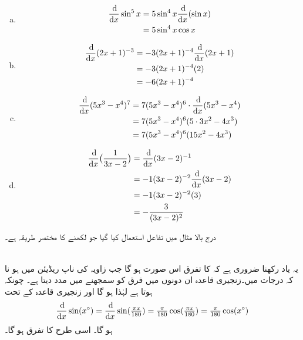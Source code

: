 \begin{enumerate}[a.]
\item
\begin{align*}
\frac{\dif}{\dif x}\sin^5x&=5\sin^4x\frac{\dif}{\dif x}(\sin x)\\
&=5\sin^4x\cos x
\end{align*}
\item
\begin{align*}
\frac{\dif}{\dif x}(2x+1)^{-3}&=-3(2x+1)^{-4}\frac{\dif}{\dif x}(2x+1)\\
&=-3(2x+1)^{-4}(2)\\
&=-6(2x+1)^{-4}
\end{align*}
\item
\begin{align*}
\frac{\dif}{\dif x}(5x^3-x^4)^7&=7(5x^3-x^4)^6\cdot \frac{\dif}{\dif x}(5x^3-x^4)\\
&=7(5x^3-x^4)^6(5\cdot 3x^2-4x^3)\\
&=7(5x^3-x^4)^6(15x^2-4x^3)
\end{align*}
\item
\begin{align*}
\frac{\dif}{\dif x}\big(\frac{1}{3x-2}\big)&=\frac{\dif}{\dif x}(3x-2)^{-1}\\
&=-1(3x-2)^{-2}\frac{\dif}{\dif x}(3x-2)\\
&=-1(3x-2)^{-2}(3)\\
&=-\frac{3}{(3x-2)^2}
\end{align*}
\end{enumerate}
درج بالا مثال میں تفاعل   استعمال کیا گیا جو  لکھنے کا مختصر طریقہ ہے۔

\\
یہ یاد رکھنا ضروری ہے کہ  کا تفرق اس صورت  ہو گا جب زاویہ کی ناپ ریڈیئن میں ہو نا کہ درجات میں۔زنجیری قاعدہ ان دونوں میں فرق کو سمجھنے میں مدد دیتا ہے۔ چونکہ  ہوتا ہے لہٰذا  ہو گا اور زنجیری قاعدہ کے تحت
\begin{align*}
\frac{\dif}{\dif x}\sin(x^{\circ})=\frac{\dif}{\dif x}\sin (\tfrac{\pi x}{180})=\tfrac{\pi}{180}\cos (\tfrac{\pi x}{180})=\tfrac{\pi}{180}\cos (x^{\circ})
\end{align*}
ہو گا۔ اسی طرح  کا تفرق  ہو گا۔

